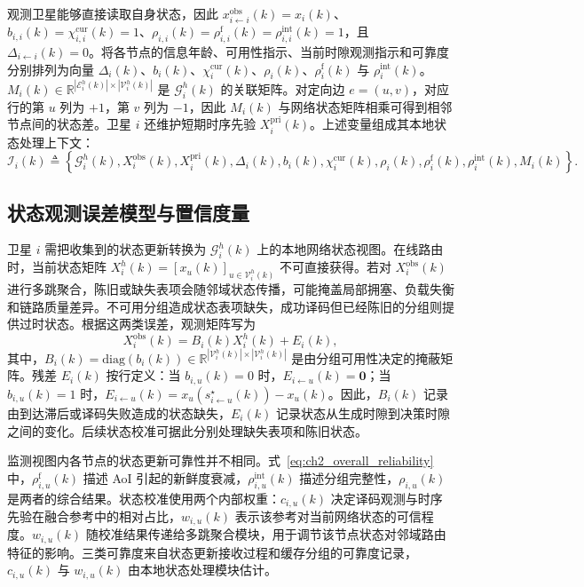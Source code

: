 观测卫星能够直接读取自身状态，因此 $x_{i\leftarrow i}^{\mathrm{obs}}(k)=x_i(k)$、$b_{i,i}(k)=\chi_{i,i}^{\mathrm{cur}}(k)=1$、$\rho_{i,i}(k)=\rho_{i,i}^{\mathrm f}(k)=\rho_{i,i}^{\mathrm{int}}(k)=1$，且 $\Delta_{i\leftarrow i}(k)=0$。将各节点的信息年龄、可用性指示、当前时隙观测指示和可靠度分别排列为向量 $\Delta_i(k)$、$b_i(k)$、$\chi_i^{\mathrm{cur}}(k)$、$\rho_i(k)$、$\rho_i^{\mathrm f}(k)$ 与 $\rho_i^{\mathrm{int}}(k)$。$M_i(k)\in\mathbb R^{|\mathcal E_i^h(k)|\times|\mathcal V_i^h(k)|}$ 是 $\mathcal G_i^h(k)$ 的关联矩阵。对定向边 $e=(u,v)$，对应行的第 $u$ 列为 $+1$，第 $v$ 列为 $-1$，因此 $M_i(k)$ 与网络状态矩阵相乘可得到相邻节点间的状态差。卫星 $i$ 还维护短期时序先验 $X_i^{\mathrm{pri}}(k)$。上述变量组成其本地状态处理上下文：
\begin{equation}
\mathcal I_i(k)
\triangleq
\left\{
\mathcal G_i^h(k),
X_i^{\mathrm{obs}}(k),
X_i^{\mathrm{pri}}(k),
\Delta_i(k),
 b_i(k),
\chi_i^{\mathrm{cur}}(k),
\rho_i(k),
\rho_i^{\mathrm f}(k),
\rho_i^{\mathrm{int}}(k),
M_i(k)
\right\}.
\label{eq:ch2_context}
\end{equation}

\subsection{状态观测误差模型与置信度量}
\label{subsec:ch2_confidence}

卫星 $i$ 需把收集到的状态更新转换为 $\mathcal G_i^h(k)$ 上的本地网络状态视图。在线路由时，当前状态矩阵 $X_i^h(k)=[x_u(k)]_{u\in\mathcal V_i^h(k)}$ 不可直接获得。若对 $X_i^{\mathrm{obs}}(k)$ 进行多跳聚合，陈旧或缺失表项会随邻域状态传播，可能掩盖局部拥塞、负载失衡和链路质量差异。不可用分组造成状态表项缺失，成功译码但已经陈旧的分组则提供过时状态。根据这两类误差，观测矩阵写为
\begin{equation}
X_i^{\mathrm{obs}}(k)=B_i(k)X_i^h(k)+E_i(k),
\label{eq:ch2_obs_error}
\end{equation}
其中，$B_i(k)=\mathrm{diag}(b_i(k))\in\mathbb R^{|\mathcal V_i^h(k)|\times|\mathcal V_i^h(k)|}$ 是由分组可用性决定的掩蔽矩阵。残差 $E_i(k)$ 按行定义：当 $b_{i,u}(k)=0$ 时，$E_{i\leftarrow u}(k)=\mathbf 0$；当 $b_{i,u}(k)=1$ 时，$E_{i\leftarrow u}(k)=x_u(s_{i\leftarrow u}^{\star}(k))-x_u(k)$。因此，$B_i(k)$ 记录由到达滞后或译码失败造成的状态缺失，$E_i(k)$ 记录状态从生成时隙到决策时隙之间的变化。后续状态校准可据此分别处理缺失表项和陈旧状态。

监测视图内各节点的状态更新可靠性并不相同。式~\eqref{eq:ch2_overall_reliability} 中，$\rho_{i,u}^{\mathrm f}(k)$ 描述 AoI 引起的新鲜度衰减，$\rho_{i,u}^{\mathrm{int}}(k)$ 描述分组完整性，$\rho_{i,u}(k)$ 是两者的综合结果。状态校准使用两个内部权重：$c_{i,u}(k)$ 决定译码观测与时序先验在融合参考中的相对占比，$w_{i,u}(k)$ 表示该参考对当前网络状态的可信程度。$w_{i,u}(k)$ 随校准结果传递给多跳聚合模块，用于调节该节点状态对邻域路由特征的影响。三类可靠度来自状态更新接收过程和缓存分组的可靠度记录，$c_{i,u}(k)$ 与 $w_{i,u}(k)$ 由本地状态处理模块估计。

